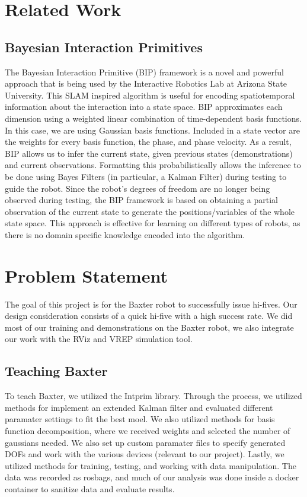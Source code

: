 \documentclass[letterpaper, 10 pt, conference]{ieeeconf}  %
\begin{document}
\section{Related Work}

\subsection{Bayesian Interaction Primitives}
The Bayesian Interaction Primitive (BIP) framework is a novel and powerful approach that is being used by the Interactive Robotics Lab at Arizona State University. This SLAM inspired algorithm is useful for encoding spatiotemporal information about the interaction into a state space. BIP approximates each dimension using a weighted linear combination of time-dependent basis functions. In this case, we are using Gaussian basis functions. Included in a state vector are the weights for every basis function, the phase, and phase velocity. As a result, BIP allows us to infer the current state, given previous states (demonstrations) and current observations. Formatting this probabilistically allows the inference to be done using Bayes Filters (in particular, a Kalman Filter) during testing to guide the robot. Since the robot's degrees of freedom are no longer being observed during testing, the BIP framework is based on obtaining a partial observation of the current state to generate the positions/variables of the whole state space. This approach is effective for learning on different types of robots, as there is no domain specific knowledge encoded into the algorithm.

\section{Problem Statement}
The goal of this project is for the Baxter robot to successfully issue hi-fives. Our design consideration consists of a quick hi-five with a high success rate. We did most of our training and demonstrations on the Baxter robot, we also integrate our work with the RViz and VREP simulation tool.

\subsection{Teaching Baxter}
To teach Baxter, we utilized the Intprim library. Through the process, we utilized methods for implement an extended Kalman filter and evaluated different paramater settings to fit the best moel. We also utilized methods for basis function decomposition, where we received weights and selected the number of gaussians needed. We also set up custom paramater files to specify generated DOFs and work with the various devices (relevant to our project). Lastly, we utilized methods for training, testing, and working with data manipulation. The data was recorded as rosbags, and much of our analysis was done inside a docker container to sanitize data and evaluate results.
\end{document}
